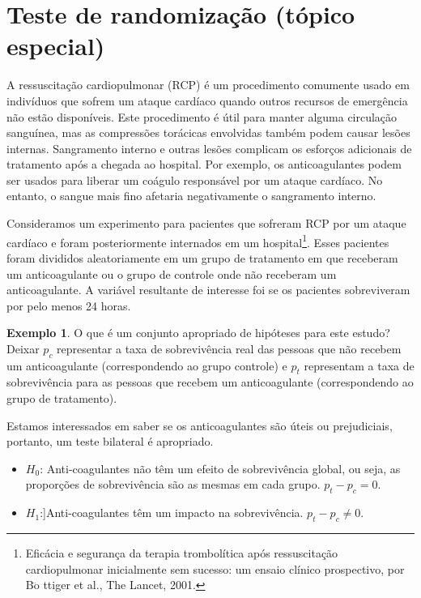 \documentclass[
]{book}
\theoremstyle{definition}
\theoremstyle{definition}
\newtheorem{example}{Exemplo}[chapter]
\theoremstyle{definition}
\theoremstyle{definition}
\theoremstyle{remark}
\begin{document}
\hypertarget{smallSampleHTForTwoOrMoreProportion}{%
\section{Teste de randomização (tópico especial)}\label{smallSampleHTForTwoOrMoreProportion}}

A ressuscitação cardiopulmonar (RCP) é um procedimento comumente usado em indivíduos que sofrem um ataque cardíaco quando outros recursos de emergência não estão disponíveis. Este procedimento é útil para manter alguma circulação sanguínea, mas as compressões torácicas envolvidas também podem causar lesões internas. Sangramento interno e outras lesões complicam os esforços adicionais de tratamento após a chegada ao hospital. Por exemplo, os anticoagulantes podem ser usados para liberar um coágulo responsável por um ataque cardíaco. No entanto, o sangue mais fino afetaria negativamente o sangramento interno.

Consideramos um experimento para pacientes que sofreram RCP por um ataque cardíaco e foram posteriormente internados em um hospital\footnote{Eficácia e segurança da terapia trombolítica após ressuscitação cardiopulmonar inicialmente sem sucesso: um ensaio clínico prospectivo, por B\(\ddot{\text{o}}\) ttiger et al., The Lancet, 2001.}. Esses pacientes foram divididos aleatoriamente em um grupo de tratamento em que receberam um anticoagulante ou o grupo de controle onde não receberam um anticoagulante. A variável resultante de interesse foi se os pacientes sobreviveram por pelo menos 24 horas.

\begin{example}
\protect\hypertarget{exm:hypothesesForCPRStudyInSmallSampleSection}{}{\label{exm:hypothesesForCPRStudyInSmallSampleSection} }O que é um conjunto apropriado de hipóteses para este estudo? Deixar \(p_c\) representar a taxa de sobrevivência real das pessoas que não recebem um anticoagulante (correspondendo ao grupo controle) e \(p_t\) representam a taxa de sobrevivência para as pessoas que recebem um anticoagulante (correspondendo ao grupo de tratamento).
\end{example}

Estamos interessados em saber se os anticoagulantes são úteis ou prejudiciais, portanto, um teste bilateral é apropriado.

\begin{itemize}
\item
  \(H_0\): Anti-coagulantes não têm um efeito de sobrevivência global, ou seja, as proporções de sobrevivência são as mesmas em cada grupo. \(p_t - p_c = 0\).
\item
  \(H_1\):{]}Anti-coagulantes têm um impacto na sobrevivência. \(p_t - p_c \neq 0\).
\end{itemize}
\end{document}
